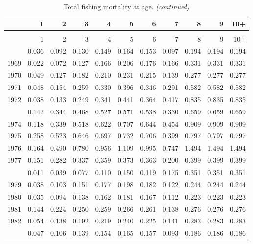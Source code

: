 \documentclass[
]{article}
\begin{document}
\begin{longtable}[t]{lrrrrrrrrrr}
\caption{\label{tab:FAA-tot-table}Total fishing mortality at age.}\\
\toprule
  & 1 & 2 & 3 & 4 & 5 & 6 & 7 & 8 & 9 & 10+\\
\midrule
\endfirsthead
\caption[]{Total fishing mortality at age. \textit{(continued)}}\\
\toprule
  & 1 & 2 & 3 & 4 & 5 & 6 & 7 & 8 & 9 & 10+\\
\midrule
\endhead

\endfoot
\bottomrule
\endlastfoot
1968 & 0.036 & 0.092 & 0.130 & 0.149 & 0.164 & 0.153 & 0.097 & 0.194 & 0.194 & 0.194\\
1969 & 0.022 & 0.072 & 0.127 & 0.166 & 0.206 & 0.176 & 0.166 & 0.331 & 0.331 & 0.331\\
1970 & 0.049 & 0.127 & 0.182 & 0.210 & 0.231 & 0.215 & 0.139 & 0.277 & 0.277 & 0.277\\
1971 & 0.048 & 0.154 & 0.259 & 0.330 & 0.396 & 0.346 & 0.291 & 0.582 & 0.582 & 0.582\\
1972 & 0.038 & 0.133 & 0.249 & 0.341 & 0.441 & 0.364 & 0.417 & 0.835 & 0.835 & 0.835\\
\addlinespace
1973 & 0.142 & 0.344 & 0.468 & 0.527 & 0.571 & 0.538 & 0.330 & 0.659 & 0.659 & 0.659\\
1974 & 0.118 & 0.339 & 0.518 & 0.622 & 0.707 & 0.644 & 0.454 & 0.909 & 0.909 & 0.909\\
1975 & 0.258 & 0.523 & 0.646 & 0.697 & 0.732 & 0.706 & 0.399 & 0.797 & 0.797 & 0.797\\
1976 & 0.164 & 0.490 & 0.780 & 0.956 & 1.109 & 0.995 & 0.747 & 1.494 & 1.494 & 1.494\\
1977 & 0.151 & 0.282 & 0.337 & 0.359 & 0.373 & 0.363 & 0.200 & 0.399 & 0.399 & 0.399\\
\addlinespace
1978 & 0.011 & 0.039 & 0.077 & 0.110 & 0.150 & 0.119 & 0.175 & 0.351 & 0.351 & 0.351\\
1979 & 0.038 & 0.103 & 0.151 & 0.177 & 0.198 & 0.182 & 0.122 & 0.244 & 0.244 & 0.244\\
1980 & 0.035 & 0.094 & 0.138 & 0.162 & 0.181 & 0.167 & 0.112 & 0.223 & 0.223 & 0.223\\
1981 & 0.144 & 0.224 & 0.250 & 0.259 & 0.266 & 0.261 & 0.138 & 0.276 & 0.276 & 0.276\\
1982 & 0.054 & 0.138 & 0.192 & 0.219 & 0.240 & 0.225 & 0.141 & 0.283 & 0.283 & 0.283\\
\addlinespace
1983 & 0.047 & 0.106 & 0.139 & 0.154 & 0.165 & 0.157 & 0.093 & 0.186 & 0.186 & 0.186\\

\end{longtable}
\end{document}
